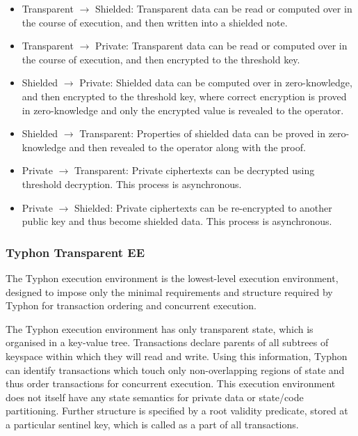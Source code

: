 \documentclass[
    9pt,            %
    commun,        %
    affiltop,       %
]{art}
\begin{document}
\begin{itemize}

\item
  Transparent $\to$ Shielded: Transparent data can be read or
  computed over in the course of execution, and then written into a
  shielded note.
\item
  Transparent $\to$ Private: Transparent data can be read or
  computed over in the course of execution, and then encrypted to the
  threshold key.
\item
  Shielded $\to$ Private: Shielded data can be computed over
  in zero-knowledge, and then encrypted to the threshold key, where
  correct encryption is proved in zero-knowledge and only the encrypted
  value is revealed to the operator.
\item
  Shielded $\to$ Transparent: Properties of shielded data can
  be proved in zero-knowledge and then revealed to the operator along
  with the proof.
\item
  Private $\to$ Transparent: Private ciphertexts can be
  decrypted using threshold decryption. This process is asynchronous.
\item
  Private $\to$ Shielded: Private ciphertexts can be
  re-encrypted to another public key and thus become shielded data. This
  process is asynchronous.
\end{itemize}

\subsubsection{Typhon Transparent EE}\label{typhon-transparent-ee}

The Typhon execution environment is the lowest-level execution
environment, designed to impose only the minimal requirements and
structure required by Typhon for transaction ordering and concurrent
execution.

The Typhon execution environment has only transparent state, which is
organised in a key-value tree. Transactions declare parents of all
subtrees of keyspace within which they will read and write. Using this
information, Typhon can identify transactions which touch only
non-overlapping regions of state and thus order transactions for
concurrent execution. This execution environment does not itself have
any state semantics for private data or state/code partitioning. Further
structure is specified by a root validity predicate, stored at a
particular sentinel key, which is called as a part of all transactions.
\end{document}
